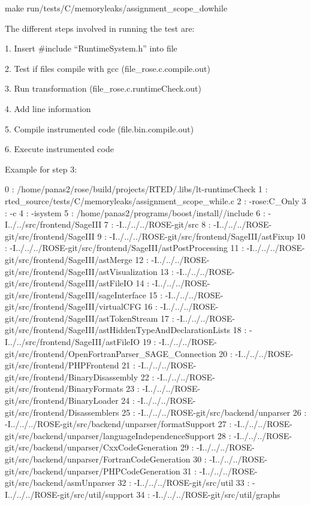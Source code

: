   make run/tests/C/memoryleaks/assignment_scope_dowhile

The different steps involved in running the test are:

1. Insert #include ``RuntimeSystem.h'' into file

2. Test if files compile with gcc (file_rose.c.compile.out)

3. Run transformation (file_rose.c.runtimeCheck.out)

4. Add line information

5. Compile instrumented code (file.bin.compile.out)

6. Execute instrumented code


Example for step 3:

  0 : /home/panas2/rose/build/projects/RTED/.libs/lt-runtimeCheck
  1 : rted_source/tests/C/memoryleaks/assignment_scope_while.c
  2 : -rose:C_Only
  3 : -c
  4 : -isystem
  5 : /home/panas2/programs/boost/install//include
  6 : -I../../src/frontend/SageIII
  7 : -I../../../ROSE-git/src
  8 : -I../../../ROSE-git/src/frontend/SageIII
  9 : -I../../../ROSE-git/src/frontend/SageIII/astFixup
  10 : -I../../../ROSE-git/src/frontend/SageIII/astPostProcessing
  11 : -I../../../ROSE-git/src/frontend/SageIII/astMerge
  12 : -I../../../ROSE-git/src/frontend/SageIII/astVisualization
  13 : -I../../../ROSE-git/src/frontend/SageIII/astFileIO
  14 : -I../../../ROSE-git/src/frontend/SageIII/sageInterface
  15 : -I../../../ROSE-git/src/frontend/SageIII/virtualCFG
  16 : -I../../../ROSE-git/src/frontend/SageIII/astTokenStream
  17 : -I../../../ROSE-git/src/frontend/SageIII/astHiddenTypeAndDeclarationLists
  18 : -I../../src/frontend/SageIII/astFileIO
  19 : -I../../../ROSE-git/src/frontend/OpenFortranParser_SAGE_Connection
  20 : -I../../../ROSE-git/src/frontend/PHPFrontend
  21 : -I../../../ROSE-git/src/frontend/BinaryDisassembly
  22 : -I../../../ROSE-git/src/frontend/BinaryFormats
  23 : -I../../../ROSE-git/src/frontend/BinaryLoader
  24 : -I../../../ROSE-git/src/frontend/Disassemblers
  25 : -I../../../ROSE-git/src/backend/unparser
  26 : -I../../../ROSE-git/src/backend/unparser/formatSupport
  27 : -I../../../ROSE-git/src/backend/unparser/languageIndependenceSupport
  28 : -I../../../ROSE-git/src/backend/unparser/CxxCodeGeneration
  29 : -I../../../ROSE-git/src/backend/unparser/FortranCodeGeneration
  30 : -I../../../ROSE-git/src/backend/unparser/PHPCodeGeneration
  31 : -I../../../ROSE-git/src/backend/asmUnparser
  32 : -I../../../ROSE-git/src/util
  33 : -I../../../ROSE-git/src/util/support
  34 : -I../../../ROSE-git/src/util/graphs

